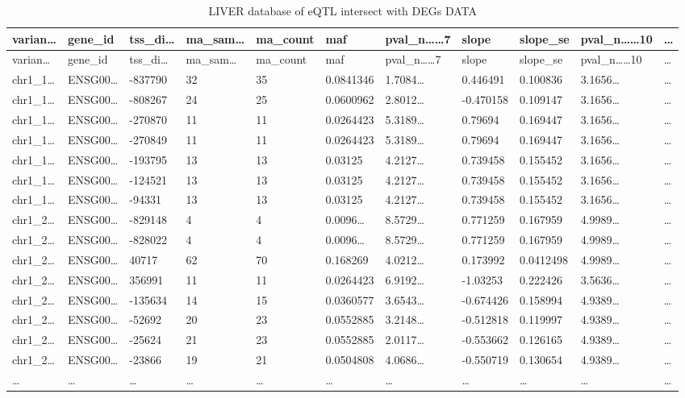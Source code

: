 \documentclass[
]{article}
\begin{document}
\begin{longtable}[]{@{}lllllllllll@{}}
\caption{\label{tab:LIVER-database-of-eQTL-intersect-with-DEGs-DATA}LIVER database of eQTL intersect with DEGs DATA}\tabularnewline
\toprule
varian\ldots{} & gene\_id & tss\_di\ldots{} & ma\_sam\ldots{} & ma\_count & maf & pval\_n\ldots\ldots7 & slope & slope\_se & pval\_n\ldots\ldots10 & \ldots{}\tabularnewline
\midrule
\endfirsthead
\toprule
varian\ldots{} & gene\_id & tss\_di\ldots{} & ma\_sam\ldots{} & ma\_count & maf & pval\_n\ldots\ldots7 & slope & slope\_se & pval\_n\ldots\ldots10 & \ldots{}\tabularnewline
\midrule
\endhead
chr1\_1\ldots{} & ENSG00\ldots{} & -837790 & 32 & 35 & 0.0841346 & 1.7084\ldots{} & 0.446491 & 0.100836 & 3.1656\ldots{} & \ldots{}\tabularnewline
chr1\_1\ldots{} & ENSG00\ldots{} & -808267 & 24 & 25 & 0.0600962 & 2.8012\ldots{} & -0.470158 & 0.109147 & 3.1656\ldots{} & \ldots{}\tabularnewline
chr1\_1\ldots{} & ENSG00\ldots{} & -270870 & 11 & 11 & 0.0264423 & 5.3189\ldots{} & 0.79694 & 0.169447 & 3.1656\ldots{} & \ldots{}\tabularnewline
chr1\_1\ldots{} & ENSG00\ldots{} & -270849 & 11 & 11 & 0.0264423 & 5.3189\ldots{} & 0.79694 & 0.169447 & 3.1656\ldots{} & \ldots{}\tabularnewline
chr1\_1\ldots{} & ENSG00\ldots{} & -193795 & 13 & 13 & 0.03125 & 4.2127\ldots{} & 0.739458 & 0.155452 & 3.1656\ldots{} & \ldots{}\tabularnewline
chr1\_1\ldots{} & ENSG00\ldots{} & -124521 & 13 & 13 & 0.03125 & 4.2127\ldots{} & 0.739458 & 0.155452 & 3.1656\ldots{} & \ldots{}\tabularnewline
chr1\_1\ldots{} & ENSG00\ldots{} & -94331 & 13 & 13 & 0.03125 & 4.2127\ldots{} & 0.739458 & 0.155452 & 3.1656\ldots{} & \ldots{}\tabularnewline
chr1\_2\ldots{} & ENSG00\ldots{} & -829148 & 4 & 4 & 0.0096\ldots{} & 8.5729\ldots{} & 0.771259 & 0.167959 & 4.9989\ldots{} & \ldots{}\tabularnewline
chr1\_2\ldots{} & ENSG00\ldots{} & -828022 & 4 & 4 & 0.0096\ldots{} & 8.5729\ldots{} & 0.771259 & 0.167959 & 4.9989\ldots{} & \ldots{}\tabularnewline
chr1\_2\ldots{} & ENSG00\ldots{} & 40717 & 62 & 70 & 0.168269 & 4.0212\ldots{} & 0.173992 & 0.0412498 & 4.9989\ldots{} & \ldots{}\tabularnewline
chr1\_2\ldots{} & ENSG00\ldots{} & 356991 & 11 & 11 & 0.0264423 & 6.9192\ldots{} & -1.03253 & 0.222426 & 3.5636\ldots{} & \ldots{}\tabularnewline
chr1\_2\ldots{} & ENSG00\ldots{} & -135634 & 14 & 15 & 0.0360577 & 3.6543\ldots{} & -0.674426 & 0.158994 & 4.9389\ldots{} & \ldots{}\tabularnewline
chr1\_2\ldots{} & ENSG00\ldots{} & -52692 & 20 & 23 & 0.0552885 & 3.2148\ldots{} & -0.512818 & 0.119997 & 4.9389\ldots{} & \ldots{}\tabularnewline
chr1\_2\ldots{} & ENSG00\ldots{} & -25624 & 21 & 23 & 0.0552885 & 2.0117\ldots{} & -0.553662 & 0.126165 & 4.9389\ldots{} & \ldots{}\tabularnewline
chr1\_2\ldots{} & ENSG00\ldots{} & -23866 & 19 & 21 & 0.0504808 & 4.0686\ldots{} & -0.550719 & 0.130654 & 4.9389\ldots{} & \ldots{}\tabularnewline
\ldots{} & \ldots{} & \ldots{} & \ldots{} & \ldots{} & \ldots{} & \ldots{} & \ldots{} & \ldots{} & \ldots{} & \ldots{}\tabularnewline
\bottomrule
\end{longtable}
\end{document}
